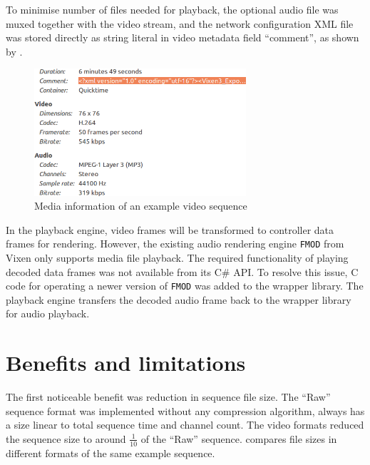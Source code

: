 To minimise number of files needed for playback, the optional audio file was muxed together with the video stream, and the network configuration XML file was stored directly as string literal in video metadata field ``comment'', as shown by .

\begin{figure}[t]
  \centering
  \includegraphics[width=0.7\textwidth]{Figs/video_info.png}
  \caption{\footnotesize Media information of an example video sequence}
  \label{fig:video-info}
\end{figure}

In the playback engine, video frames will be transformed to controller data frames for rendering. However, the existing audio rendering engine \texttt{FMOD} from Vixen only supports media file playback. The required functionality of playing decoded data frames was not available from its C\# API. To resolve this issue, C code for operating a newer version of \texttt{FMOD} was added to the wrapper library. The playback engine transfers the decoded audio frame back to the wrapper library for audio playback.

\section{Benefits and limitations}

The first noticeable benefit was reduction in sequence file size. The ``Raw'' sequence format was implemented without any compression algorithm, always has a size linear to total sequence time and channel count. The video formats reduced the sequence size to around $\frac{1}{10}$ of the ``Raw'' sequence.  compares file sizes in different formats of the same example sequence.

